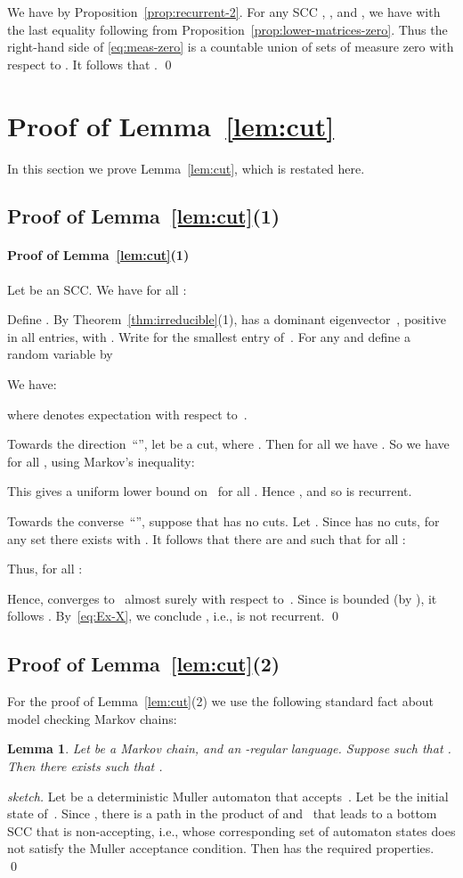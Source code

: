\documentclass{elsarticle}
\newtheorem{lemma}[definition]{Lemma}
\begin{document}
We have  by Proposition~\ref{prop:recurrent-2}.
For any SCC , , and , we
have
 with the last equality following from
Proposition~\ref{prop:lower-matrices-zero}.  Thus the right-hand side
of \eqref{eq:meas-zero} is a countable union of sets of measure zero
with respect to .  It follows that
.
\qed

\section{Proof of Lemma~\ref{lem:cut}} \label{sec:cut-proof}
In this section we prove Lemma~\ref{lem:cut}, which is restated here.

\lemcut*

\subsection{Proof of Lemma~\ref{lem:cut}(1)}
\paragraph{Proof of Lemma~\ref{lem:cut}(1)}
Let  be an SCC.
We have for all :

Define .
By Theorem~\ref{thm:irreducible}(1),  has a dominant
eigenvector~, positive in all entries, with .  Write  for the smallest entry
of~.  For any  and 
define a random variable  by

We have:

where  denotes expectation with respect to~.

Towards the direction~``'', let  be a cut, where .
Then for all  we have .
So we have for all , using Markov's inequality:

This gives a uniform lower bound on~ for all .
Hence , and so  is recurrent.

Towards the converse~``'', suppose that  has no cuts.
Let .
Since  has no cuts, for any set  there exists  with .
It follows that there are  and  such that for all :

Thus, for all :

Hence,  converges to~ almost surely with respect to~.
Since  is bounded (by ), it follows .
By~\eqref{eq:Ex-X}, we conclude , i.e.,  is not recurrent.
\qed

\subsection{Proof of Lemma~\ref{lem:cut}(2)}
For the proof of Lemma~\ref{lem:cut}(2)  we use the following standard
fact about model checking Markov chains:
\begin{lemma} \label{lem:regular}
Let  be a Markov chain, and  an -regular language.
Suppose  such that .
Then there exists  such that .
\end{lemma}
\begin{proof}[sketch]
Let  be a deterministic Muller automaton that accepts~.
Let  be the initial state of~.
Since , there is a path  in the product of  and~ that leads to a bottom SCC that is non-accepting, i.e., whose corresponding set of automaton states does not satisfy the Muller acceptance condition.
Then  has the required properties.
\qed
\end{proof}
\end{document}
